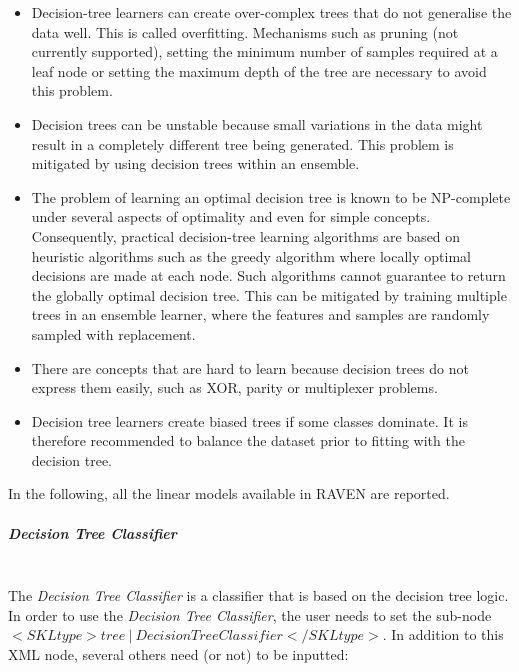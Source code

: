 \begin{itemize}
\item Decision-tree learners can create over-complex trees that do not generalise the data well. This is called overfitting. Mechanisms such as pruning (not currently supported), setting the minimum number of samples required at a leaf node or setting the maximum depth of the tree are necessary to avoid this problem.
\item Decision trees can be unstable because small variations in the data might result in a completely different tree being generated. This problem is mitigated by using decision trees within an ensemble.
\item The problem of learning an optimal decision tree is known to be NP-complete under several aspects of optimality and even for simple concepts. Consequently, practical decision-tree learning algorithms are based on heuristic algorithms such as the greedy algorithm where locally optimal decisions are made at each node. Such algorithms cannot guarantee to return the globally optimal decision tree. This can be mitigated by training multiple trees in an ensemble learner, where the features and samples are randomly sampled with replacement.
\item There are concepts that are hard to learn because decision trees do not express them easily, such as XOR, parity or multiplexer problems.
\item Decision tree learners create biased trees if some classes dominate. It is therefore recommended to balance the dataset prior to fitting with the decision tree.
\end{itemize}
In the following, all the linear models available in RAVEN are reported.
\subparagraph{Decision Tree Classifier}
\mbox{}
\\The \textit{Decision Tree Classifier} is a classifier that is based on the decision tree logic.
\\In order to use the \textit{Decision Tree Classifier}, the user needs to set the sub-node $<SKLtype>tree~\vert~DecisionTreeClassifier</SKLtype>$. In addition to this XML node, several others need (or not) to be inputted:
